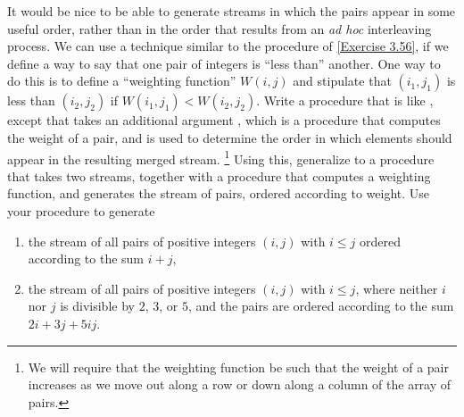 \begin{exercise}
	\label{Exercise 3.70}
	It would be nice to be able to generate streams in which the pairs appear in some useful order, rather than in the order that results from an \emph{ad hoc} interleaving process.
	We can use a technique similar to the  procedure of \cref{Exercise 3.56}, if we define a way to say that one pair of integers is “less than” another.
	One way to do this is to define a “weighting function” \( W(i, j) \) and stipulate that \( (i_1, j_1) \) is less than \( (i_2, j_2) \) if \( W(i_1, j_1) < W(i_2, j_2) \).
	Write a procedure  that is like , except that  takes an additional argument , which is a procedure that computes the weight of a pair, and is used to determine the order in which elements should appear in the resulting merged stream.%
	\footnote{
		We will require that the weighting function be such that the weight of a pair increases as we move out along a row or down along a column of the array of pairs.
	}
	Using this, generalize  to a procedure  that takes two streams, together with a procedure that computes a weighting function, and generates the stream of pairs, ordered according to weight.
	Use your procedure to generate
	\begin{enumerate}[label = \alph*., leftmargin = *]

		\item
			the stream of all pairs of positive integers \( (i, j) \) with \( i ≤ j \) ordered according to the sum \( i + j \),

		\item
			the stream of all pairs of positive integers \( (i, j) \) with \( i ≤ j \), where neither \( i \) nor \( j \) is divisible by \( 2 \), \( 3 \), or \( 5 \), and the pairs are ordered according to the sum \( 2i + 3j + 5ij \).

	\end{enumerate}
\end{exercise}



